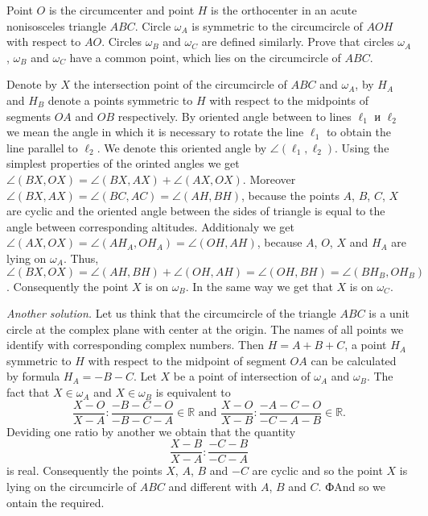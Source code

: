 \problem
Point $O$ is the circumcenter and point $H$ is the orthocenter in an acute
nonisosceles triangle $ABC$.
Circle $\omega_A$ is symmetric to the circumcircle of $AOH$ with respect to
$AO$.
Circles $\omega_B$ and $\omega_C$ are defined similarly.
Prove that circles $\omega_A$, $\omega_B$ and $\omega_C$ have a common point,
which lies on the circumcircle of $ABC$.

\solution
Denote by $X$ the intersection point of the circumcircle of $ABC$ and $\omega_A$, by $H_A$ and $H_B$ denote a points symmetric to $H$ with respect to the midpoints of segments $OA$ and $OB$ respectively. By oriented angle between to lines $\ell_1$ и $\ell_2$ we mean the angle in which it is necessary to rotate the line $\ell_1$ to obtain the line parallel to $\ell_2$. We denote this oriented angle by $\angle (\ell_1, \ell_2)$. Using the simplest properties of the orinted angles we get $\angle(BX,OX)=\angle(BX,AX)+\angle(AX,OX)$. Moreover $\angle(BX,AX)=\angle (BC,AC)=\angle (AH,BH)$, because the
points $A$, $B$, $C$, $X$ are cyclic and the oriented angle between the sides of triangle is equal to the angle between corresponding altitudes. Additionaly we get $\angle(AX,OX)=\angle(AH_A,OH_A)=\angle (OH,AH)$, because $A$, $O$, $X$ and  $H_A$ are lying on $\omega_A$. Thus, $\angle(BX,OX)=\angle (AH,BH)+\angle (OH,AH)=\angle (OH,BH)=\angle (BH_B,OH_B)$. Consequently the point $X$ is on $\omega_B$. In the same way we get that $X$  is on $\omega_C$.

\emph{Another solution.} 
Let us think that the circumcircle of the triangle $ABC$ is a unit circle at the complex plane with center at the origin. The names of all points we identify with corresponding complex numbers. Then $H=A+B+C$, a point $H_A$ symmetric to $H$ with respect to the midpoint of segment $OA$ can be calculated by formula $H_A=-B-C$. Let $X$  be a point of intersection of $\omega_A$ and  $\omega_B$. The fact that $X\in\omega_A$ and $X\in \omega_B$ is equivalent to 
\[
\frac{X-O}{X-A}:\frac{-B-C-O}{-B-C-A}\in {\mathbb R} \mbox{ and } \frac{X-O}{X-B}:\frac{-A-C-O}{-C-A-B}\in {\mathbb R}.
\]
Deviding one ratio by another we obtain that the quantity \[\frac{X-B}{X-A}:\frac{-C-B}{-C-A}\] is real. Consequently the points $X$, $A$, $B$ and $-C$ are cyclic and so the point $X$ is lying on the circumcirle of $ABC$ and different with  $A$, $B$ and $C$. ФAnd so we ontain the required.
\endproblem
